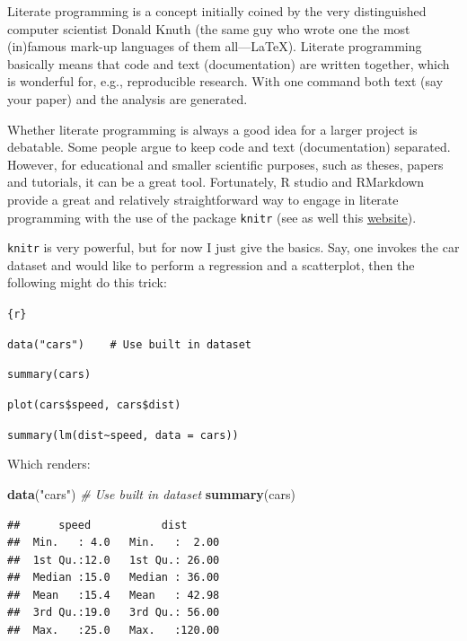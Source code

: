 \documentclass[]{article}
\newenvironment{Shaded}{\begin{snugshade}}{\end{snugshade}}
\newcommand{\KeywordTok}[1]{\textcolor[rgb]{0.13,0.29,0.53}{\textbf{#1}}}
\newcommand{\StringTok}[1]{\textcolor[rgb]{0.31,0.60,0.02}{#1}}
\newcommand{\CommentTok}[1]{\textcolor[rgb]{0.56,0.35,0.01}{\textit{#1}}}
\newcommand{\NormalTok}[1]{#1}
\theoremstyle{definition}
\theoremstyle{definition}
\theoremstyle{definition}
\theoremstyle{remark}
\begin{document}
Literate programming is a concept initially coined by the very
distinguished computer scientist Donald Knuth (the same guy who wrote
one the most (in)famous mark-up languages of them all---LaTeX). Literate
programming basically means that code and text (documentation) are
written together, which is wonderful for, e.g., reproducible research.
With one command both text (say your paper) and the analysis are
generated.

Whether literate programming is always a good idea for a larger project
is debatable. Some people argue to keep code and text (documentation)
separated. However, for educational and smaller scientific purposes,
such as theses, papers and tutorials, it can be a great tool.
Fortunately, R studio and RMarkdown provide a great and relatively
straightforward way to engage in literate programming with the use of
the package \texttt{knitr} (see as well this
\href{https://yihui.name/knitr/}{website}).

\texttt{knitr} is very powerful, but for now I just give the basics.
Say, one invokes the car dataset and would like to perform a regression
and a scatterplot, then the following might do this trick:

\texttt{\textasciigrave{}\textasciigrave{}\textasciigrave{}\{r\}}

\texttt{data("cars")\ \ \ \ \#\ Use\ built\ in\ dataset}

\texttt{summary(cars)}

\texttt{plot(cars\$speed,\ cars\$dist)}

\texttt{summary(lm(dist\textasciitilde{}speed,\ data\ =\ cars))}

\texttt{\textasciigrave{}\textasciigrave{}\textasciigrave{}}

Which renders:

\begin{Shaded}
\begin{Highlighting}[]
\KeywordTok{data}\NormalTok{(}\StringTok{"cars"}\NormalTok{)    }\CommentTok{# Use built in dataset }
\KeywordTok{summary}\NormalTok{(cars)}
\end{Highlighting}
\end{Shaded}

\begin{verbatim}
##      speed           dist       
##  Min.   : 4.0   Min.   :  2.00  
##  1st Qu.:12.0   1st Qu.: 26.00  
##  Median :15.0   Median : 36.00  
##  Mean   :15.4   Mean   : 42.98  
##  3rd Qu.:19.0   3rd Qu.: 56.00  
##  Max.   :25.0   Max.   :120.00
\end{verbatim}
\end{document}

